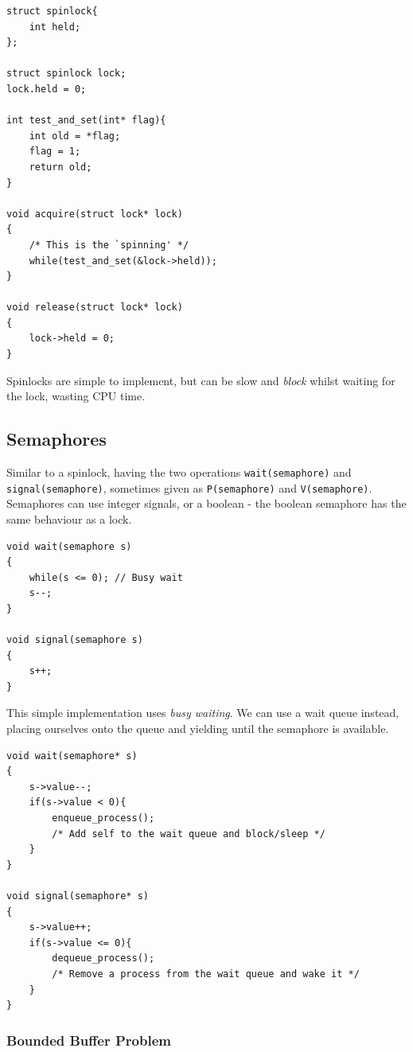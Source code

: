 \documentclass{article}
\begin{document}
\begin{verbatim}
struct spinlock{
    int held;
};

struct spinlock lock;
lock.held = 0;

int test_and_set(int* flag){
    int old = *flag;
    flag = 1;
    return old;
}

void acquire(struct lock* lock)
{
    /* This is the `spinning' */
    while(test_and_set(&lock->held));
}

void release(struct lock* lock)
{
    lock->held = 0;
}
\end{verbatim}

Spinlocks are simple to implement, but can be slow and \emph{block}
whilst waiting for the lock, wasting CPU time.

\subsection{Semaphores}\label{semaphores}

Similar to a spinlock, having the two operations
\texttt{wait(semaphore)} and \texttt{signal(semaphore)}, sometimes given
as \texttt{P(semaphore)} and \texttt{V(semaphore)}. Semaphores can use
integer signals, or a boolean - the boolean semaphore has the same
behaviour as a lock.

\begin{verbatim}
void wait(semaphore s)
{
    while(s <= 0); // Busy wait
    s--;
}

void signal(semaphore s)
{
    s++;
}
\end{verbatim}

This simple implementation uses \emph{busy waiting}. We can use a wait
queue instead, placing ourselves onto the queue and yielding until the
semaphore is available.

\begin{verbatim}
void wait(semaphore* s)
{
    s->value--;
    if(s->value < 0){
        enqueue_process();
        /* Add self to the wait queue and block/sleep */
    }
}

void signal(semaphore* s)
{
    s->value++;
    if(s->value <= 0){
        dequeue_process();
        /* Remove a process from the wait queue and wake it */
    }
}
\end{verbatim}

\subsubsection{Bounded Buffer Problem}\label{bounded-buffer-problem}
\end{document}
